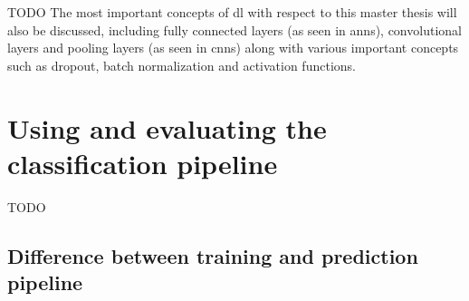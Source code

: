 





TODO
The most important concepts of \gls{dl} with respect to this master thesis will also be discussed, including fully connected layers (as seen in \glspl{ann}), convolutional layers and pooling layers (as seen in \glspl{cnn}) along with various important concepts such as dropout, batch normalization and activation functions.


\section{Using and evaluating the classification pipeline}
\label{sec:processing_signals_evaluating_and_using}



TODO


\subsection{Difference between training and prediction pipeline}
\label{subsec:processing_signals_evaluating_and_using_training_vs_prediction}

